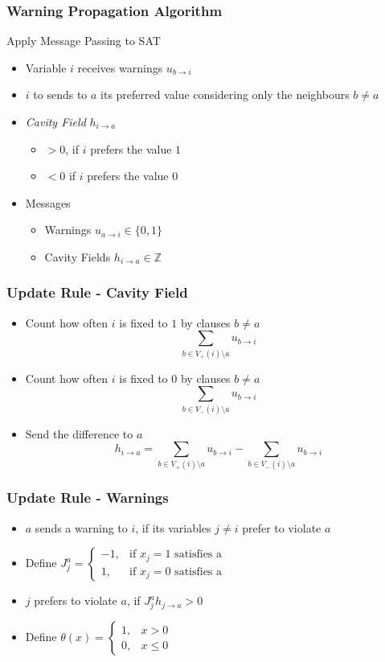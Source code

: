 \begin{frame}
	\frametitle{Warning Propagation Algorithm}
	Apply Message Passing to SAT
	\begin{itemize}
		\item Variable $i$ receives warnings  $u_{b \rightarrow i}$
		\item $i$ to sends to $a$ its preferred value considering only the neighbours $b \neq a$
		\item \emph{Cavity Field} $h_{i \rightarrow a}$
		\begin{itemize}
		\item $>0$, if $i$ prefers the value $1$    \item $<0$ if $i$ prefers the value $0$
		\end{itemize}
		\item Messages
			\begin{itemize}
				\item Warnings $u_{a \rightarrow i} \in \{0, 1\}$
				\item Cavity Fields $h_{i \rightarrow a} \in \mathbb{Z}$
			\end{itemize}
	\end{itemize}
\end{frame}

\begin{frame}
	\frametitle{Update Rule - Cavity Field}
	
	\begin{itemize}
		\item Count how often $i$ is fixed to $1$ by clauses $b \neq a$
			$$ \sum_{b \in V_+(i) \setminus a} u_{b \rightarrow i}$$	
		\item Count how often $i$ is fixed to $0$ by clauses $b \neq a$
			$$ \sum_{b \in V_-(i) \setminus a} u_{b \rightarrow i}$$	
		\item Send the difference to $a$
			$$ h_{i \rightarrow a} = \sum_{b \in V_+(i) \setminus a} u_{b \rightarrow i} - \sum_{b \in V_-(i) \setminus a} u_{b \rightarrow i}$$
	\end{itemize}
\end{frame}

\begin{frame}
	\frametitle{Update Rule - Warnings}
	
	\begin{itemize}
		\item $a$ sends a warning to $i$, if its variables $j \neq i$ prefer to violate $a$
		\item Define $J_j^a = \begin{cases}
      -1, & \text{if } x_j = 1 \text{ satisfies a}  \\
      1, & \text{if } x_j = 0 \text{ satisfies a}
    \end{cases}$ 
    \item $j$ prefers to violate $a$, if $J_j^a h_{j \rightarrow a} > 0$ 
    \item Define $\theta(x) = \begin{cases}
      1, & x > 0  \\
      0, & x \leq 0
    \end{cases}$
	\end{itemize}
\end{frame}

